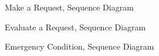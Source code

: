 \begin{flushleft}
\newpage

\begin{figure}[H]
	\caption{Make a Request, Sequence Diagram}
	\label{Figure 11}
\end{figure}

\newpage

\begin{figure}[H]
	\caption{Evaluate a Request, Sequence Diagram}
	\label{Figure 12}
\end{figure}

\newpage

\begin{figure}[H]
	\caption{Emergency Condition, Sequence Diagram}
	\label{Figure 13}
\end{figure}




\end{flushleft}
